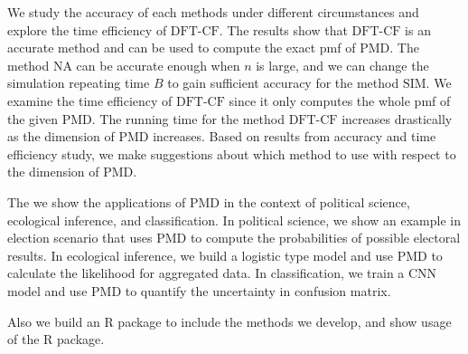 \documentclass[12pt]{article}
\newcommand{\PMD}{\textrm{PMD}}
\newcommand{\SIM}{{\textrm{SIM}}}
\newcommand{\NA}{{\textrm{NA}}}
\newcommand{\dft}{{\textrm{DFT-CF}}}
\begin{document}
We study the accuracy of each methods under different circumstances and explore the time efficiency of $\dft$. The results show that $\dft$ is an accurate method and can be used to compute the exact pmf of $\PMD$. The method $\NA$ can be accurate enough when $n$ is large, and we can change the simulation repeating time $B$ to gain sufficient accuracy for the method $\SIM$. We examine the time efficiency of $\dft$ since it only computes the whole pmf of the given $\PMD$. The running time for the method $\dft$ increases drastically as the dimension of $\PMD$ increases. Based on results from accuracy and time efficiency study, we make suggestions about which method to use with respect to the dimension of $\PMD$.

The we show the applications of $\PMD$ in the context of political science, ecological inference, and classification. In political science, we show an example in election scenario that uses $\PMD$ to compute the probabilities of possible electoral results. In ecological inference, we build a logistic type model and use $\PMD$ to calculate the likelihood for aggregated data. In classification, we train a CNN model and use $\PMD$ to quantify the uncertainty in confusion matrix.

Also we build an R package to include the methods we develop, and show usage of the R package.



\end{document}

